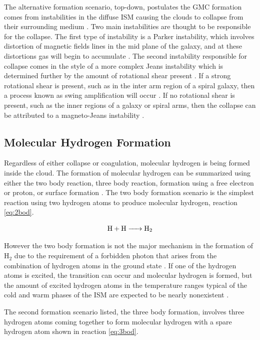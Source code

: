 The alternative formation scenario, top-down, postulates the GMC formation comes from instabilities in the diffuse ISM causing the clouds to collapse from their surrounding medium \citep{mckee2007}.  Two main instabilities are thought to be responsible for the collapse.  The first type of instability is a Parker instability, which involves distortion of magnetic fields lines in the mid plane of the galaxy, and at these distortions gas will begin to accumulate \citep{parker1966, dobbs2013}.  The second instability responsible for collapse comes in the style of a more complex Jeans instability which is determined further by the amount of rotational shear present \citep{mckee2007}.  If a strong rotational shear is present, such as in the inter arm region of a spiral galaxy, then a process known as swing amplification will occur \citep{mckee2007}.  If no rotational shear is present, such as the inner regions of a galaxy or spiral arms, then the collapse can be attributed to a magneto-Jeans instability \citep{elmegreen1987,kim2001}.

\subsection{Molecular Hydrogen Formation}\label{h2form}

Regardless of either collapse or coagulation, molecular hydrogen is being formed inside the cloud.  The formation of molecular hydrogen can be summarized using either the two body reaction, three body reaction, formation using a free electron or proton, or surface formation \citep{krumholz2014}.  The two body formation scenario is the simplest reaction using two hydrogen atoms to produce molecular hydrogen, reaction \ref{eq:2bod}.

\begin{equation}\label{eq:2bod}
  \ce{H + H -> H_2}
\end{equation}

However the two body formation is not the major mechanism in the formation of H$_2$ due to the requirement of a forbidden photon that arises from the combination of hydrogen atoms in the ground state \citep{gould1963}.  If one of the hydrogen atoms is excited, the transition can occur and molecular hydrogen is formed, but the amount of excited hydrogen atoms in the temperature ranges typical of the cold and warm phases of the ISM are expected to be nearly nonexistent \citep{krumholz2014}.

The second formation scenario listed, the three body formation, involves three hydrogen atoms coming together to form molecular hydrogen with a spare hydrogen atom shown in reaction \ref{eq:3bod}.

